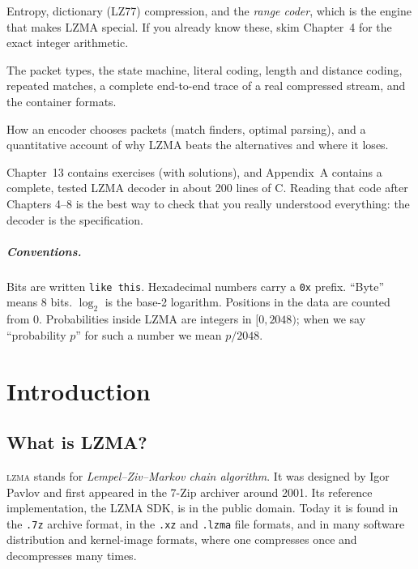 \documentclass[11pt,a4paper,oneside]{book}
\newcommand{\bits}[1]{\texttt{#1}}
\newcommand{\LZMA}{\textsc{lzma}}
\begin{document}
\begin{description}[leftmargin=2em,style=nextline]
\item[Foundations (Chapters 1--4)] Entropy, dictionary (LZ77) compression, and the \emph{range coder}, which is the
  engine that makes LZMA special. If you already know these, skim Chapter~4 for the exact integer arithmetic.
\item[The LZMA format (Chapters 5--10)] The packet types, the state machine, literal coding, length and distance
  coding, repeated matches, a complete end-to-end trace of a real compressed stream, and the container formats.
\item[The encoder and the big picture (Chapters 11--12)] How an encoder chooses packets (match finders, optimal
  parsing), and a quantitative account of why LZMA beats the alternatives and where it loses.
\end{description}

Chapter~13 contains exercises (with solutions), and Appendix~A contains a complete, tested LZMA decoder in about 200
lines of C. Reading that code after Chapters 4--8 is the best way to check that you really understood
everything: the decoder is the specification.

\paragraph{Conventions.}
Bits are written \bits{like this}. Hexadecimal numbers carry a \texttt{0x} prefix. ``Byte'' means 8 bits.
$\log_2$ is the base-2 logarithm. Positions in the data are counted from 0.
Probabilities inside LZMA are integers in $[0,2048)$; when we say ``probability $p$'' for such a number we mean
$p/2048$.

\mainmatter

\chapter{Introduction}

\section{What is LZMA?}

\LZMA{} stands for \emph{Lempel--Ziv--Markov chain algorithm}. It was designed by Igor Pavlov and first appeared in
the 7-Zip archiver around 2001. Its reference implementation, the LZMA SDK, is in the public domain. Today it is found in
the \texttt{.7z} archive format, in the \texttt{.xz} and \texttt{.lzma} file formats, and in many software distribution
and kernel-image formats, where one compresses once and decompresses many times.
\end{document}
